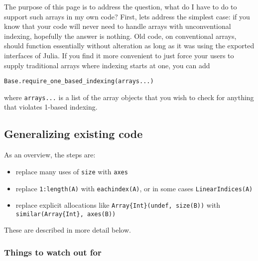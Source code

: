 The purpose of this page is to address the question, {\textquotedbl}what do I have to do to support such arrays in my own code?{\textquotedbl}  First, let{\textquotesingle}s address the simplest case: if you know that your code will never need to handle arrays with unconventional indexing, hopefully the answer is {\textquotedbl}nothing.{\textquotedbl} Old code, on conventional arrays, should function essentially without alteration as long as it was using the exported interfaces of Julia. If you find it more convenient to just force your users to supply traditional arrays where indexing starts at one, you can add




\begin{verbatim}
Base.require_one_based_indexing(arrays...)
\end{verbatim}



where \texttt{arrays...} is a list of the array objects that you wish to check for anything that violates 1-based indexing.



\hypertarget{12133789893433293548}{}


\subsection{Generalizing existing code}



As an overview, the steps are:



\begin{itemize}
\item replace many uses of \texttt{size} with \texttt{axes}


\item replace \texttt{1:length(A)} with \texttt{eachindex(A)}, or in some cases \texttt{LinearIndices(A)}


\item replace explicit allocations like \texttt{Array\{Int\}(undef, size(B))} with \texttt{similar(Array\{Int\}, axes(B))}

\end{itemize}


These are described in more detail below.



\hypertarget{3112549925833933267}{}


\subsubsection{Things to watch out for}



